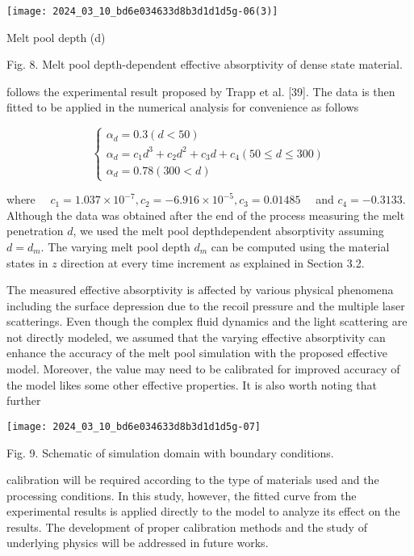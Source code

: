 \documentclass[10pt]{article}
\begin{document}
\begin{center}
\texttt{[image: 2024\_03\_10\_bd6e034633d8b3d1d1d5g-06(3)]}
\end{center}

Melt pool depth (d)

Fig. 8. Melt pool depth-dependent effective absorptivity of dense state material.

follows the experimental result proposed by Trapp et al. [39]. The data is then fitted to be applied in the numerical analysis for convenience as follows

\[
\left\{\begin{array}{c}
\alpha_{d}=0.3(d<50)  \tag{19}\\
\alpha_{d}=c_{1} d^{3}+c_{2} d^{2}+c_{3} d+c_{4}(50 \leq d \leq 300) \\
\alpha_{d}=0.78(300<d)
\end{array}\right.
\]

where $\quad c_{1}=1.037 \times 10^{-7}, c_{2}=-6.916 \times 10^{-5}, c_{3}=0.01485 \quad$ and $c_{4}=-0.3133$. Although the data was obtained after the end of the process measuring the melt penetration $d$, we used the melt pool depthdependent absorptivity assuming $d=d_{m}$. The varying melt pool depth $d_{m}$ can be computed using the material states in $z$ direction at every time increment as explained in Section 3.2.

The measured effective absorptivity is affected by various physical phenomena including the surface depression due to the recoil pressure and the multiple laser scatterings. Even though the complex fluid dynamics and the light scattering are not directly modeled, we assumed that the varying effective absorptivity can enhance the accuracy of the melt pool simulation with the proposed effective model. Moreover, the value may need to be calibrated for improved accuracy of the model likes some other effective properties. It is also worth noting that further

\begin{center}
\texttt{[image: 2024\_03\_10\_bd6e034633d8b3d1d1d5g-07]}
\end{center}

Fig. 9. Schematic of simulation domain with boundary conditions.

calibration will be required according to the type of materials used and the processing conditions. In this study, however, the fitted curve from the experimental results is applied directly to the model to analyze its effect on the results. The development of proper calibration methods and the study of underlying physics will be addressed in future works.
\end{document}
